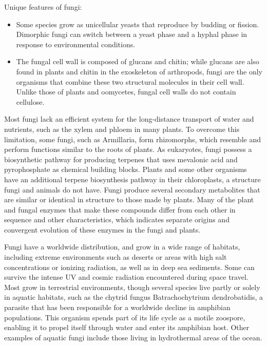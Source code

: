 Unique features of fungi:

\begin{itemize}
\tightlist
\item
  Some species grow as unicellular yeasts that reproduce by budding or fission. Dimorphic fungi can switch between a yeast phase and a hyphal phase in response to environmental conditions.
\item
  The fungal cell wall is composed of glucans and chitin; while glucans are also found in plants and chitin in the exoskeleton of arthropods, fungi are the only organisms that combine these two structural molecules in their cell wall. Unlike those of plants and oomycetes, fungal cell walls do not contain cellulose.
\end{itemize}

Most fungi lack an efficient system for the long-distance transport of water and nutrients, such as the xylem and phloem in many plants. To overcome this limitation, some fungi, such as Armillaria, form rhizomorphs, which resemble and perform functions similar to the roots of plants. As eukaryotes, fungi possess a biosynthetic pathway for producing terpenes that uses mevalonic acid and pyrophosphate as chemical building blocks. Plants and some other organisms have an additional terpene biosynthesis pathway in their chloroplasts, a structure fungi and animals do not have. Fungi produce several secondary metabolites that are similar or identical in structure to those made by plants. Many of the plant and fungal enzymes that make these compounds differ from each other in sequence and other characteristics, which indicates separate origins and convergent evolution of these enzymes in the fungi and plants.

Fungi have a worldwide distribution, and grow in a wide range of habitats, including extreme environments such as deserts or areas with high salt concentrations or ionizing radiation, as well as in deep sea sediments. Some can survive the intense UV and cosmic radiation encountered during space travel. Most grow in terrestrial environments, though several species live partly or solely in aquatic habitats, such as the chytrid fungus Batrachochytrium dendrobatidis, a parasite that has been responsible for a worldwide decline in amphibian populations. This organism spends part of its life cycle as a motile zoospore, enabling it to propel itself through water and enter its amphibian host. Other examples of aquatic fungi include those living in hydrothermal areas of the ocean.

